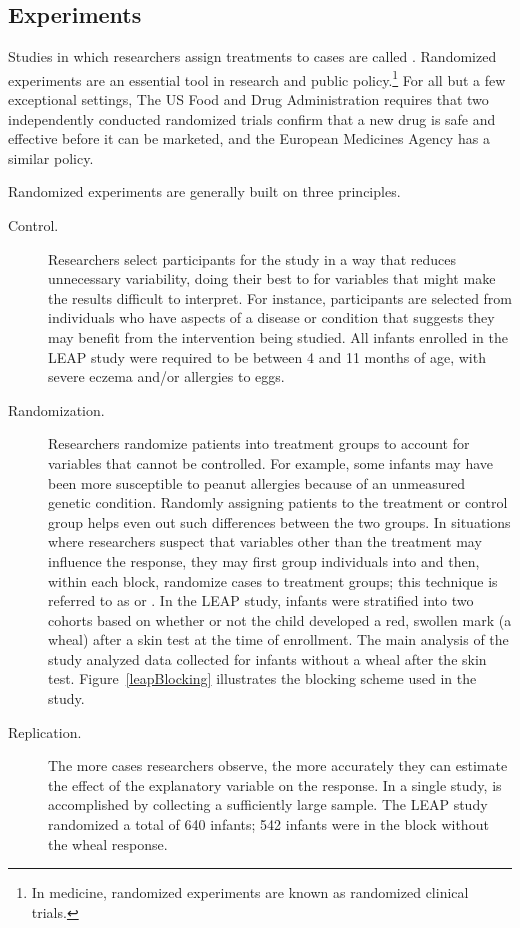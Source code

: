 \subsection[Experiments]{Experiments}
\label{experiments}

Studies in which researchers assign treatments to cases are called . Randomized experiments are an essential tool in research and public policy.\footnote{In medicine, randomized experiments are known as randomized clinical trials.}  For all but a few exceptional settings,  The US Food and Drug Administration requires that two independently conducted randomized trials confirm that a new drug is safe and effective before it can be marketed,  and the European Medicines Agency has a similar policy.  

Randomized experiments are generally built on three principles.


\begin{description}

	\item[Control.] Researchers select participants for the study in a way that reduces unnecessary variability, doing their best to  for variables that might make the results difficult to interpret. For instance, participants are selected from individuals who have aspects of a disease or condition that suggests they may benefit from the intervention being studied. All infants enrolled in the LEAP study were required to be between 4 and 11 months of age, with severe eczema and/or allergies to eggs.

	\item[Randomization.] Researchers randomize patients into treatment groups to account for variables that cannot be controlled. For example, some infants may have been more susceptible to peanut allergies because of an unmeasured genetic condition. Randomly assigning patients to the treatment or control group helps even out such differences between the two groups. In situations where researchers suspect that variables other than the treatment may influence the response, they may first group individuals into  and then, within each block, randomize cases to treatment groups; this technique is referred to as  or .  In the LEAP study, infants were stratified into two cohorts based on whether or not the child developed a red, swollen mark (a wheal) after a skin test at the time of enrollment. The main analysis of the study analyzed data collected for infants without a wheal after the skin test. Figure~\ref{leapBlocking} illustrates the blocking scheme used in the study. 

	\item[Replication.] The more cases researchers observe, the more accurately they can estimate the effect of the explanatory variable on the response. In a single study,  is accomplished by collecting a sufficiently large sample. The LEAP study randomized a total of 640 infants; 542 infants were in the block without the wheal response. 

\end{description}

